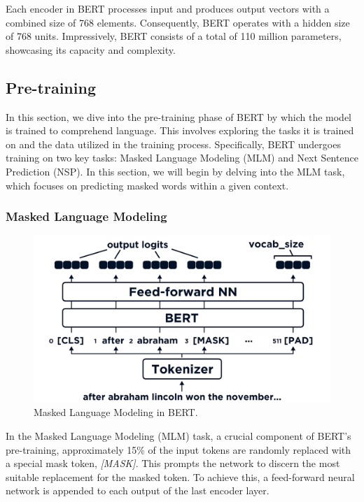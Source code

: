 \documentclass[a4paper,10pt]{report} %
\begin{document}
Each encoder in BERT processes input and produces output vectors with a combined size of 768 elements. Consequently, BERT operates with a hidden size of 768 units. Impressively, BERT consists of a total of 110 million parameters, showcasing its capacity and complexity.


\subsection{Pre-training}
In this section, we dive into the pre-training phase of BERT by which the model is trained to comprehend language. This involves exploring the tasks it is trained on and the data utilized in the training process. Specifically, BERT undergoes training on two key tasks: Masked Language Modeling (MLM) and Next Sentence Prediction (NSP). In this section, we will begin by delving into the MLM task, which focuses on predicting masked words within a given context.

\subsubsection{Masked Language Modeling}
\begin{figure}
  \centering
  \includegraphics[width=12cm]{img/mlm_bert.png} %
  \caption{Masked Language Modeling in BERT.}
  \label{fig:mlm_bert}
\end{figure}
In the Masked Language Modeling (MLM) task, a crucial component of BERT's pre-training, approximately 15\% of the input tokens are randomly replaced with a special mask token, \textit{[MASK]}. This prompts the network to discern the most suitable replacement for the masked token. To achieve this, a feed-forward neural network is appended to each output of the last encoder layer.
\end{document}
